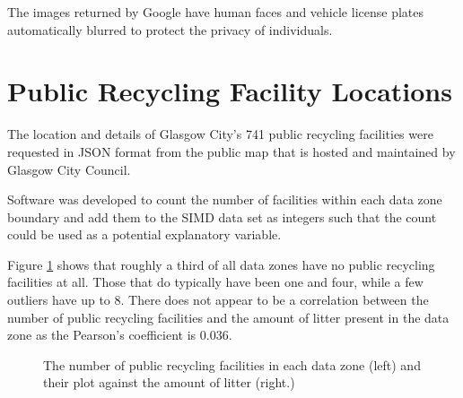 \documentclass{thesis}
\begin{document}
The images returned by Google have human faces and vehicle license plates automatically blurred to protect the privacy of individuals.

\section{Public Recycling Facility Locations}

The location and details of Glasgow City's 741 public recycling facilities were requested in JSON format from the public map that is hosted and maintained by Glasgow City Council.

Software was developed to count the number of facilities within each data zone boundary and add them to the SIMD data set as integers such that the count could be used as a potential explanatory variable.

Figure \ref{fig:public-recycling-points-analysis} shows that roughly a third of all data zones have no public recycling facilities at all. Those that do typically have been one and four, while a few outliers have up to 8. There does not appear to be a correlation between the number of public recycling facilities and the amount of litter present in the data zone as the Pearson's coefficient is 0.036.

\begin{figure}
    \centering
    \qquad
    \caption{The number of public recycling facilities in each data zone (left) and their plot against the amount of litter (right.)}
    \label{fig:public-recycling-points-analysis}
\end{figure}
\end{document}
